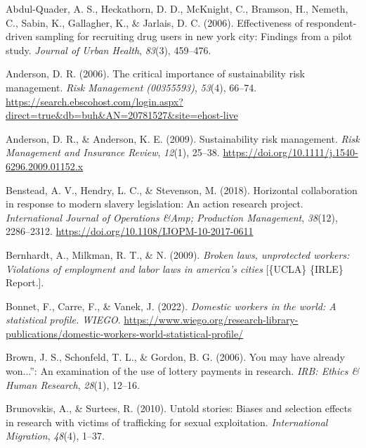 \documentclass[
  12pt,
]{article}
\newlength{\cslhangindent}
\newenvironment{CSLReferences}[2] %
 {\begin{list}{}{%
  \setlength{\itemindent}{0pt}
  \setlength{\leftmargin}{0pt}
  \setlength{\parsep}{0pt}
  \ifodd #1
   \setlength{\leftmargin}{\cslhangindent}
   \setlength{\itemindent}{-1\cslhangindent}
  \fi
  \setlength{\itemsep}{#2\baselineskip}}}
 {\end{list}}
\theoremstyle{plain}
\theoremstyle{definition}
\begin{document}
\label{refs}
\begin{CSLReferences}{1}{0}
Abdul-Quader, A. S., Heckathorn, D. D., McKnight, C., Bramson, H.,
Nemeth, C., Sabin, K., Gallagher, K., \& Jarlais, D. C. (2006).
Effectiveness of respondent-driven sampling for recruiting drug users in
new york city: Findings from a pilot study. \emph{Journal of Urban
Health}, \emph{83}(3), 459--476.

Anderson, D. R. (2006). The critical importance of sustainability risk
management. \emph{Risk Management (00355593)}, \emph{53}(4), 66--74.
\url{https://search.ebscohost.com/login.aspx?direct=true&db=buh&AN=20781527&site=ehost-live}

Anderson, D. R., \& Anderson, K. E. (2009). Sustainability risk
management. \emph{Risk Management and Insurance Review}, \emph{12}(1),
25--38. \url{https://doi.org/10.1111/j.1540-6296.2009.01152.x}

Benstead, A. V., Hendry, L. C., \& Stevenson, M. (2018). Horizontal
collaboration in response to modern slavery legislation: An action
research project. \emph{International Journal of Operations \&Amp;
Production Management}, \emph{38}(12), 2286--2312.
\url{https://doi.org/10.1108/IJOPM-10-2017-0611}

Bernhardt, A., Milkman, R. T., \& N. (2009). \emph{Broken laws,
unprotected workers: Violations of employment and labor laws in
america's cities} {[}\{UCLA\} \{IRLE\} Report.{]}.

Bonnet, F., Carre, F., \& Vanek, J. (2022). \emph{Domestic workers in
the world: A statistical profile. {WIEGO}}.
\url{https://www.wiego.org/research-library-publications/domestic-workers-world-statistical-profile/}

Brown, J. S., Schonfeld, T. L., \& Gordon, B. G. (2006). You may have
already won...'': An examination of the use of lottery payments in
research. \emph{{IRB}: Ethics \& Human Research}, \emph{28}(1), 12--16.

Brunovskis, A., \& Surtees, R. (2010). Untold stories: Biases and
selection effects in research with victims of trafficking for sexual
exploitation. \emph{International Migration}, \emph{48}(4), 1--37.


\end{CSLReferences}
\end{document}
